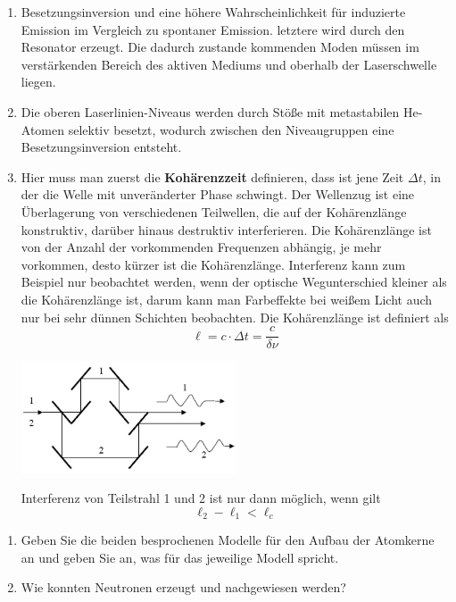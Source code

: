\documentclass[12pt,a4paper,ngerman]{article}
\begin{document}
\begin{enumerate}
\item Besetzungsinversion und eine höhere Wahrscheinlichkeit für induzierte Emission im Vergleich zu spontaner Emission. letztere wird durch den Resonator erzeugt. Die dadurch zustande kommenden Moden müssen im verstärkenden Bereich des aktiven Mediums und oberhalb der Laserschwelle liegen.
\item Die oberen Laserlinien-Niveaus werden durch Stöße mit metastabilen He-Atomen selektiv besetzt, wodurch zwischen den Niveaugruppen eine Besetzungsinversion entsteht. 
\item Hier muss man zuerst die \textbf{Kohärenzzeit} definieren, dass ist jene Zeit $\Delta t$, in der die Welle mit unveränderter Phase schwingt. 
Der Wellenzug ist eine Überlagerung von verschiedenen Teilwellen, die auf der Kohärenzlänge konstruktiv, darüber hinaus destruktiv interferieren. Die Kohärenzlänge ist von der Anzahl der vorkommenden Frequenzen abhängig, je mehr vorkommen, desto kürzer ist die Kohärenzlänge. Interferenz kann zum Beispiel nur beobachtet werden, wenn der optische Wegunterschied kleiner als die Kohärenzlänge ist, darum kann man Farbeffekte bei weißem Licht auch nur bei sehr dünnen Schichten beobachten. 
Die Kohärenzlänge ist definiert als
\begin{equation*}
 \ell = c \cdot \Delta t = \frac{c}{\delta \nu}
 \end{equation*} 
 
\begin{center}
 \includegraphics[width = 0.5\textwidth]{interferometer.png} 
\end{center}
 
 Interferenz von Teilstrahl 1 und 2 ist nur dann möglich, wenn gilt \begin{equation*}
 \ell_2 - \ell_1 < \ell_c
 \end{equation*}
\end{enumerate}


\pagebreak

\begin{framed}
\begin{enumerate}
\item Geben Sie die beiden besprochenen Modelle für den Aufbau der Atomkerne an und geben Sie an, was für das jeweilige Modell spricht.
\item Wie konnten Neutronen erzeugt und nachgewiesen werden?
\end{enumerate}
\end{framed}
\end{document}
